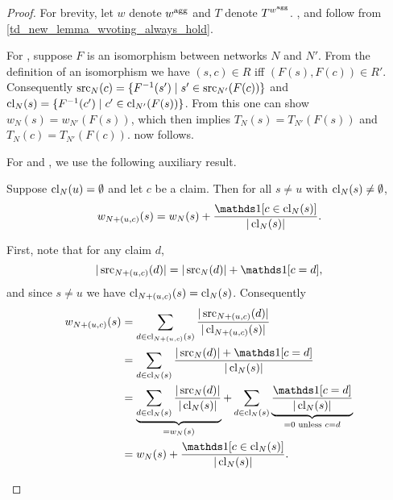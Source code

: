 \begin{proof}
    For brevity, let $w$ denote $w^{\operatorname{agg}}$ and $T$ denote $T^{w^{\operatorname{agg}}}$.
    \claimcoherence{}, \marginaltrustworthiness{} and \trustbasedmon{} follow
    from \cref{td_new_lemma_wvoting_always_hold}.

    For \symmetry{}, suppose $F$ is an isomorphism between networks $N$ and
    $N'$. From the definition of an isomorphism we have $(s, c) \in R$ iff
    $(F(s), F(c)) \in R'$. Consequently $\operatorname{src}_N(c) = \{F^{-1}(s') \mid s' \in
    \operatorname{src}_{N'}(F(c))\}$ and $\operatorname{cl}_N(s) = \{F^{-1}(c') \mid c' \in
    \operatorname{cl}_{N'}(F(s))\}$. From this one can show $w_N(s) = w_{N'}(F(s))$,
    which then implies $T_N(s) = T_{N'}(F(s))$ and $T_N(c) = T_{N'}(F(c))$.
    \symmetry{} now follows.

    For \freshposresp{} and \sourceposresp{}, we use the following auxiliary
    result.

    \begin{claim}
        \label{td_new_claim_wagree_new_report}
        Suppose $\operatorname{cl}_N(u) = \emptyset$ and let $c$ be a claim. Then for all
        $s \ne u$ with $\operatorname{cl}_N(s) \ne \emptyset$,
        \[
            w_{\addclaim{N}{u}{c}}(s) = w_N(s) +
            \frac{\indicator{c \in \claims_N(s)}}{|\claims_N(s)|}.
        \]
    \end{claim}
    \begin{claimproof}
        First, note that for any claim $d$,
        \[
            |\src_{\addclaim{N}{u}{c}}(d)| = |\src_N(d)| + \indicator{c = d},
        \]
        and since $s \ne u$ we have $\operatorname{cl}_{{N} + ({u}, {c})}(s) =
        \operatorname{cl}_N(s)$. Consequently
        \begin{align*}
            w_{\addclaim{N}{u}{c}}(s)
            &= \sum_{d \in \claims_{\addclaim{N}{u}{c}}(s)}{
                \frac{|\src_{\addclaim{N}{u}{c}}(d)|}{|\claims_{\addclaim{N}{u}{c}}(s)|}
            } \\
            &= \sum_{d \in \claims_N(s)}{
                \frac{|\src_N(d)| + \indicator{c = d}}{|\claims_N(s)|}
            } \\
            &=
            \underbrace{
                \sum_{d \in \claims_N(s)}{
                    \frac{|\src_N(d)|}{|\claims_N(s)|}
                }
            }_{= w_N(s)}
            + \sum_{d \in \claims_N(s)}{
                \underbrace{
                    \frac{\indicator{c = d}}{|\claims_N(s)|}
                }_{= 0 \text{ unless } c = d}
            } \\
            &= w_N(s) + \frac{\indicator{c \in \claims_N(s)}}{|\claims_N(s)|}.
        \end{align*}
    \end{claimproof}


\end{proof}
